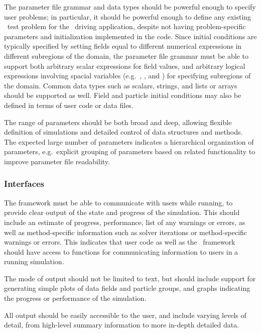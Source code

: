 \documentclass[10pt,twocolumn]{article}
\begin{document}
The parameter file grammar and data types should be powerful enough to
specify user problems; in particular, it should be powerful enough to
define any existing \enzo\ test problem for the \enzoii\ driving
application, despite not having problem-specific parameters and
initialization implemented in the code.  Since initial conditions are
typically specified by setting fields equal to different numerical
expressions in different subregions of the domain, the parameter file
grammar must be able to support both arbitrary scalar expressions for
field values, and arbitrary logical expressions involving spacial
variables (e.g.~, , and ) for specifying
subregions of the domain.  Common data types such as scalars, strings,
and lists or arrays should be supported as well.  Field and particle
initial conditions may also be defined in terms of user code or data
files.

The range of parameters should be both broad and deep, allowing
flexible definition of simulations and detailed control of data
structures and methods.  The expected large number of parameters
indicates a hierarchical organization of parameters, e.g.~explicit
grouping of parameters based on related functionality to improve
parameter file readability.

\subsubsection{Interfaces} \label{sss:require-interfaces}

The framework must be able to communicate with users while running, to
provide clear output of the state and progress of the simulation.
This should include an estimate of progress, performance, list of any
warnings or errors, as well as method-specific information such as
solver iterations or method-specific warnings or errors.  This
indicates that user code as well as the \cello\ framework should have
access to functions for communicating information to users in a
running simulation.

The mode of output should not be limited to text, but should include
support for generating simple plots of data fields and particle
groups, and graphs indicating the progress or performance of the
simulation.

All output should be easily accessible to the user, and include
varying levels of detail, from high-level summary information to more
in-depth detailed data.
\end{document}
